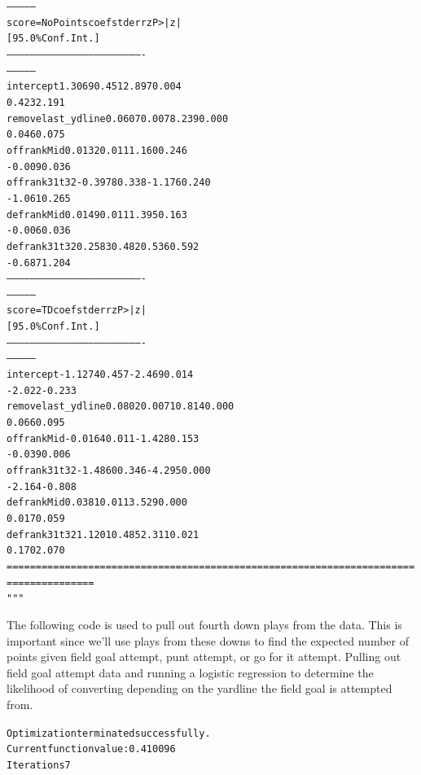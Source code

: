 \documentclass[letterpaper,10pt,english]{/anaconda/lib/python2.7/site-packages/sphinx/texinputs/sphinxhowto}
\newenvironment{InvisibleVerbatim}
        {\begin{mdframed}[leftmargin=0.1\linewidth,innerleftmargin=3pt,innerrightmargin=3pt, userdefinedwidth=1\linewidth, linewidth=0pt, linecolor=white, usetwoside=false]}
        {\end{mdframed}}
\begin{document}
\begin{InvisibleVerbatim}
\begin{alltt}
---------------
   score=NoPoints       coef    std err          z      P>|z|
[95.0\% Conf. Int.]
----------------------------------------------------------------------
---------------
intercept             1.3069      0.451      2.897      0.004
0.423     2.191
removelast\_ydline     0.0607      0.007      8.239      0.000
0.046     0.075
offrankMid            0.0132      0.011      1.160      0.246
-0.009     0.036
offrank31t32         -0.3978      0.338     -1.176      0.240
-1.061     0.265
defrankMid            0.0149      0.011      1.395      0.163
-0.006     0.036
defrank31t32          0.2583      0.482      0.536      0.592
-0.687     1.204
----------------------------------------------------------------------
---------------
         score=TD       coef    std err          z      P>|z|
[95.0\% Conf. Int.]
----------------------------------------------------------------------
---------------
intercept            -1.1274      0.457     -2.469      0.014
-2.022    -0.233
removelast\_ydline     0.0802      0.007     10.814      0.000
0.066     0.095
offrankMid           -0.0164      0.011     -1.428      0.153
-0.039     0.006
offrank31t32         -1.4860      0.346     -4.295      0.000
-2.164    -0.808
defrankMid            0.0381      0.011      3.529      0.000
0.017     0.059
defrank31t32          1.1201      0.485      2.311      0.021
0.170     2.070
======================================================================
===============
"""\end{alltt}

            \end{InvisibleVerbatim}
            
        
    

The following code is used to pull out fourth down plays from the data.
This is important since we'll use plays from these downs to find the
expected number of points given field goal attempt, punt attempt, or go
for it attempt.
Pulling out field goal attempt data and running a logistic regression to
determine the likelihood of converting depending on the yardline the
field goal is attempted from.

    

        
        

            
                \begin{InvisibleVerbatim}
                \vspace{-0.5\baselineskip}
\begin{alltt}Optimization terminated successfully.
         Current function value: 0.410096
         Iterations 7
\end{alltt}

            \end{InvisibleVerbatim}
            
\end{document}
